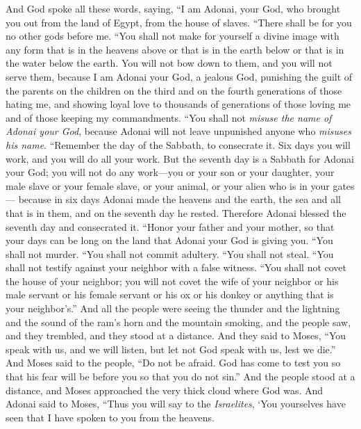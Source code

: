 \begin{biblechapter} %
 And God spoke all these words, saying,
\verse “I am Adonai, your God, who brought you out from the land of Egypt, from the house of slaves.
\verse “There shall be for you no other gods before me.
\verse “You shall not make for yourself a divine image with any form that is in the heavens above or that is in the earth below or that is in the water below the earth.
\verse You will not bow down to them, and you will not serve them, because I am Adonai your God, a jealous God, punishing the guilt of the parents on the children on the third and on the fourth generations of those hating me,
\verse and showing loyal love to thousands of generations of those loving me and of those keeping my commandments.
\verse “You shall not \textit{misuse the name of Adonai your God}, because Adonai will not leave unpunished anyone who \textit{misuses his name}.
\verse “Remember the day of the Sabbath, to consecrate it.
\verse Six days you will work, and you will do all your work.
\verse But the seventh day is a Sabbath for Adonai your God; you will not do any work—you or your son or your daughter, your male slave or your female slave, or your animal, or your alien who is in your gates—
\verse because in six days Adonai made the heavens and the earth, the sea and all that is in them, and on the seventh day he rested. Therefore Adonai blessed the seventh day and consecrated it.
\verse “Honor your father and your mother, so that your days can be long on the land that Adonai your God is giving you.
\verse “You shall not murder.
\verse “You shall not commit adultery.
\verse “You shall not steal.
\verse “You shall not testify against your neighbor with a false witness.
\verse “You shall not covet the house of your neighbor; you will not covet the wife of your neighbor or his male servant or his female servant or his ox or his donkey or anything that is your neighbor’s.”
\verse And all the people were seeing the thunder and the lightning and the sound of the ram’s horn and the mountain smoking, and the people saw, and they trembled, and they stood at a distance.
\verse And they said to Moses, “You speak with us, and we will listen, but let not God speak with us, lest we die.”
\verse And Moses said to the people, “Do not be afraid. God has come to test you so that his fear will be before you so that you do not sin.”
\verse And the people stood at a distance, and Moses approached the very thick cloud where God was.
 And Adonai said to Moses, “Thus you will say to the \textit{Israelites}, ‘You yourselves have seen that I have spoken to you from the heavens.

\end{biblechapter}
